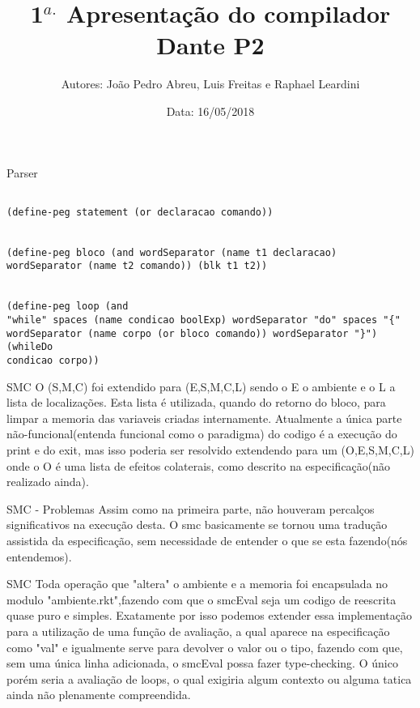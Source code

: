 \documentclass{beamer}
\title[Compiladores 2018.1]{1$^{a.}$ Apresentação do compilador Dante P2}
\author[Abrev.]{Autores: João Pedro Abreu, Luis Freitas e Raphael Leardini}
\institute[UFF]{Universidade Federal Fluminense}
\date{Data: 16/05/2018}
\begin{document}

\begin{frame}[plain]

\titlepage

\end{frame}


\begin{frame}{Parser}
\begin{verbatim}

(define-peg statement (or declaracao comando))


(define-peg bloco (and wordSeparator (name t1 declaracao) wordSeparator (name t2 comando)) (blk t1 t2))


(define-peg loop (and
"while" spaces (name condicao boolExp) wordSeparator "do" spaces "{" wordSeparator (name corpo (or bloco comando)) wordSeparator "}") (whileDo 
condicao corpo))

\end{verbatim}

\end{frame}

\begin{frame}{SMC}
O (S,M,C) foi extendido para (E,S,M,C,L) sendo o E o ambiente e o L a lista de localizações. Esta lista é utilizada, quando do retorno do bloco, para limpar a memoria das
variaveis criadas internamente. Atualmente a única parte não-funcional(entenda funcional como o paradigma) do codigo é a execução do print e do exit, mas isso poderia ser
resolvido extendendo para um (O,E,S,M,C,L) onde o O é uma lista de efeitos colaterais, como descrito na especificação(não realizado ainda).
\end{frame}

\begin{frame}{SMC - Problemas}
Assim como na primeira parte, não houveram percalços significativos na execução desta. O smc basicamente se tornou uma tradução assistida da especificação, sem necessidade
de entender o que se esta fazendo(nós entendemos).
\end{frame}

\begin{frame}{SMC}
Toda operação que "altera" o ambiente e a memoria foi encapsulada no modulo "ambiente.rkt",fazendo com que o smcEval seja um codigo de reescrita quase puro e simples.
Exatamente por isso podemos extender essa implementação para a utilização de uma função de avaliação, a qual aparece na especificação como "val" e igualmente serve
para devolver o valor ou o tipo, fazendo com que, sem uma única linha adicionada, o smcEval possa fazer type-checking. O único porém seria a avaliação de loops, o qual
exigiria algum contexto ou alguma tatica ainda não plenamente compreendida.
\end{frame}
\end{document}
